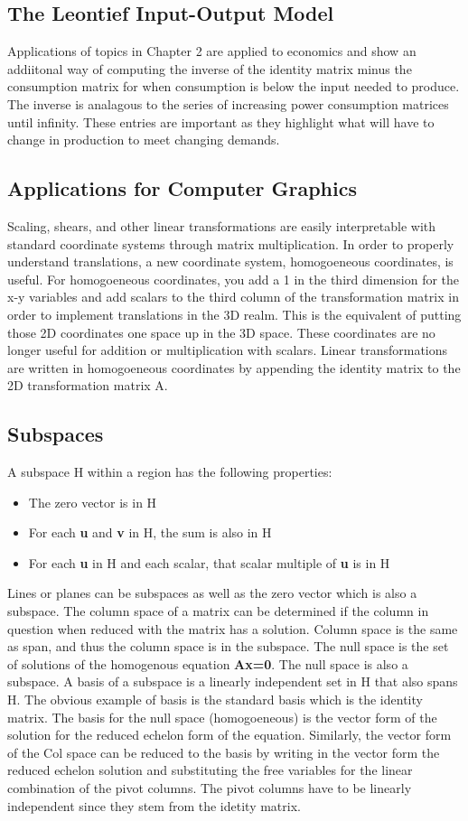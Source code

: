 \documentclass[12pt]{article}
\begin{document}
\subsection{The Leontief Input-Output Model}
Applications of topics in Chapter 2 are applied to economics and show an addiitonal way of computing the inverse of the identity matrix minus the consumption matrix %
for when consumption is below the input needed to produce. The inverse is analagous to the series of increasing power consumption matrices until infinity. These %
entries are important as they highlight what will have to change in production to meet changing demands. 
\subsection{Applications for Computer Graphics}
Scaling, shears, and other linear transformations are easily interpretable with standard coordinate systems through matrix multiplication. In order to properly understand %
translations, a new coordinate system, homogoeneous coordinates, is useful. For homogoeneous coordinates, you add a 1 in the third dimension for the x-y variables and %
add scalars to the third column of the transformation matrix in order to implement %
translations in the 3D realm. This is the equivalent of putting those 2D coordinates one space up in the 3D space. These coordinates are no longer useful for addition or %
multiplication with scalars. Linear transformations are written in homogoeneous coordinates by appending the identity matrix to the 2D transformation matrix A. %
\subsection{Subspaces}
A subspace H within a region has the following properties:
\begin{itemize}
    \item The zero vector is in H
    \item For each \textbf{u} and \textbf{v} in H, the sum is also in H
    \item For each \textbf{u} in H and each scalar, that scalar multiple of \textbf{u} is in H
\end{itemize}
Lines or planes can be subspaces as well as the zero vector which is also a subspace. The column space of a matrix can be determined if the column in question when reduced %
with the matrix has a solution. Column space is the same as span, and thus the column space is in the subspace. The null space is the set of solutions of the homogenous %
equation \textbf{Ax=0}. The null space is also a subspace. A basis of a subspace is a linearly independent set in H that also spans H. The obvious example of basis is the %
standard basis which is the identity matrix. The basis for the null space (homogoeneous) is the vector form of the solution for the reduced echelon form of the equation. %
Similarly, the vector form of the Col space can be reduced to the basis by writing in the vector form the reduced echelon solution and substituting the free variables %
for the linear combination of the pivot columns. The pivot columns have to be linearly independent since they stem from the idetity matrix. 
\end{document}
